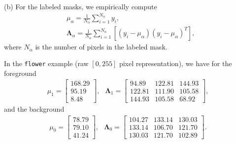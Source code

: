 \documentclass{article}
\begin{document}
\noindent
(b) For the labeled masks, we empirically compute
\begin{align*}
	&\mu_\alpha = \frac{1}{N_\alpha}\sum_{i=1}^{N_\alpha}y_i,\\
	&\mathbf{\Lambda}_{\alpha} = \frac{1}{N_\alpha}\sum_{i=1}^{N_\alpha}\left[(y_i - \mu_\alpha)(y_i - \mu_\alpha)^T\right],
\end{align*}
where $N_\alpha$ is the number of pixels in the labeled mask.
%

In the \texttt{flower} example (raw $[0, 255]$ pixel representation), we have for the foreground
\begin{align*}
	\mu_1 = 
	\begin{bmatrix}
    168.29 \\
    95.19 \\
    8.48
\end{bmatrix}, \;\;\,
	\mathbf{\Lambda}_1 =
\begin{bmatrix}
 94.89 & 122.81 & 144.93 \\
 122.81 & 111.90 & 105.58 \\
 144.93 & 105.58 &  68.92
\end{bmatrix},
\end{align*}
and the background
\begin{align*}
	\mu_0 = 
	\begin{bmatrix}
    78.79 \\
    79.10 \\
    41.24
\end{bmatrix}, \;\;\,
	\mathbf{\Lambda}_0 =
\begin{bmatrix}
104.27 & 133.14 & 130.03 \\
133.14 & 106.70 & 121.70 \\
130.03 & 121.70 & 102.89
\end{bmatrix}.
\end{align*}
%
\end{document}
